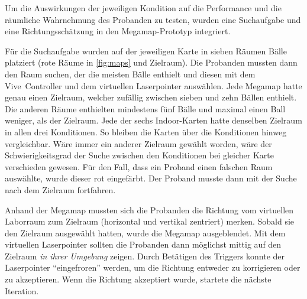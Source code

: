 Um die Auswirkungen der jeweiligen Kondition auf die Performance und die räumliche Wahrnehmung des Probanden zu testen, wurden eine Suchaufgabe und eine Richtungsschätzung in den Megamap-Prototyp integriert.

Für die Suchaufgabe wurden auf der jeweiligen Karte in sieben Räumen Bälle platziert (rote Räume in \autoref{fig:maps} und Zielraum).
Die Probanden mussten dann den Raum suchen, der die meisten Bälle enthielt und diesen mit dem Vive~Controller und dem virtuellen Laserpointer auswählen.
Jede Megamap hatte genau einen Zielraum, welcher zufällig zwischen sieben und zehn Bällen enthielt.
Die anderen Räume enthielten mindestens fünf Bälle und maximal einen Ball weniger, als der Zielraum.
Jede der sechs Indoor-Karten hatte denselben Zielraum in allen drei Konditionen.
So bleiben die Karten über die Konditionen hinweg vergleichbar.
Wäre immer ein anderer Zielraum gewählt worden, wäre der Schwierigkeitsgrad der Suche zwischen den Konditionen bei gleicher Karte verschieden gewesen.
Für den Fall, dass ein Proband einen falschen Raum auswählte, wurde dieser rot eingefärbt.
Der Proband musste dann mit der Suche nach dem Zielraum fortfahren.

Anhand der Megamap mussten sich die Probanden die Richtung vom virtuellen Laborraum zum Zielraum (horizontal und vertikal zentriert) merken.
Sobald sie den Zielraum ausgewählt hatten, wurde die Megamap ausgeblendet.
Mit dem virtuellen Laserpointer sollten die Probanden dann möglichst mittig auf den Zielraum \emph{in ihrer Umgebung} zeigen.
Durch Betätigen des Triggers konnte der Laserpointer \enquote{eingefroren} werden, um die Richtung entweder zu korrigieren oder zu akzeptieren.
Wenn die Richtung akzeptiert wurde, startete die nächste Iteration.


